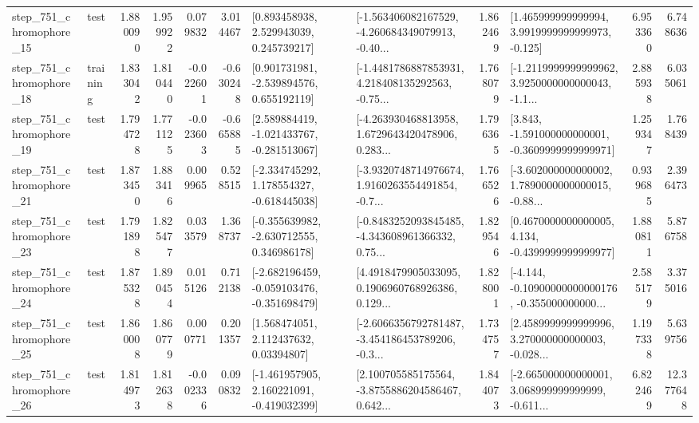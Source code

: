 \begin{tabular}{llrrrrllrlrr}
  step\_751\_chromophore\_15 &      test &      1.880090 &    1.959922 &      0.079832 &  3.014467 &     [0.893458938, 2.529943039, 0.245739217] &  [-1.563406082167529, -4.260684349079913, -0.40... &       1.862469 &    [1.465999999999994, 3.9919999999999973, -0.125] &            6.953360 &          6.748636 \\
  step\_751\_chromophore\_18 &  training &      1.833042 &    1.810440 &     -0.022601 & -0.630248 &    [0.901731981, -2.539894576, 0.655192119] &  [-1.4481786887853931, 4.218408135292563, -0.75... &       1.768079 &  [-1.2119999999999962, 3.9250000000000043, -1.1... &            2.885938 &          6.035061 \\
  step\_751\_chromophore\_19 &      test &      1.794728 &    1.771125 &     -0.023603 & -0.665885 &   [2.589884419, -1.021433767, -0.281513067] &  [-4.263930468813958, 1.6729643420478906, 0.283... &       1.796365 &   [3.843, -1.591000000000001, -0.3609999999999971] &            1.259347 &          1.768439 \\
  step\_751\_chromophore\_21 &      test &      1.873450 &    1.883416 &      0.009965 &  0.528515 &   [-2.334745292, 1.178554327, -0.618445038] &  [-3.9320748714976674, 1.9160263554491854, -0.7... &       1.766526 &  [-3.602000000000002, 1.7890000000000015, -0.88... &            0.939685 &          2.396473 \\
  step\_751\_chromophore\_23 &      test &      1.791898 &    1.825477 &      0.033579 &  1.368737 &   [-0.355639982, -2.630712555, 0.346986178] &  [-0.8483252093845485, -4.343608961366332, 0.75... &       1.829546 &   [0.4670000000000005, 4.134, -0.4399999999999977] &            1.880811 &          5.876758 \\
  step\_751\_chromophore\_24 &      test &      1.875328 &    1.890454 &      0.015126 &  0.712138 &  [-2.682196459, -0.059103476, -0.351698479] &  [4.4918479905033095, 0.1906960768926386, 0.129... &       1.828001 &  [-4.144, -0.10900000000000176, -0.355000000000... &            2.585179 &          3.375016 \\
  step\_751\_chromophore\_25 &      test &      1.860008 &    1.860779 &      0.000771 &  0.201357 &      [1.568474051, 2.112437632, 0.03394807] &  [-2.6066356792781487, -3.454186453789206, -0.3... &       1.734757 &  [2.4589999999999996, 3.270000000000003, -0.028... &            1.197338 &          5.639756 \\
  step\_751\_chromophore\_26 &      test &      1.814973 &    1.812638 &     -0.002336 &  0.090832 &   [-1.461957905, 2.160221091, -0.419032399] &  [2.100705585175564, -3.8755886204586467, 0.642... &       1.844073 &  [-2.665000000000001, 3.068999999999999, -0.611... &            6.822469 &         12.377648 \\

\end{tabular}
